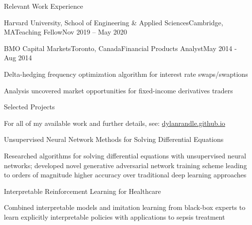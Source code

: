 \documentclass{resume} %
\begin{document}
\begin{rSection}{Relevant Work Experience}
\begin{rSubsection}{Harvard University, School of Engineering \& Applied Sciences}{Cambridge, MA}{Teaching Fellow}{Nov 2019 -- May 2020}
\end{rSubsection}


\begin{rSubsection}{BMO Capital Markets}{Toronto, Canada}{Financial Products Analyst}{May 2014 - Aug 2014}

\item Delta-hedging frequency optimization algorithm for interest rate swaps/swaptions
\item Analysis uncovered market opportunities for fixed-income derivatives traders
    
\end{rSubsection}


\end{rSection}


\newpage

\begin{rSection}{Selected Projects}

For all of my available work and further details, see: \url{dylanrandle.github.io}

\begin{rSubsection}{Unsupervised Neural Network Methods for Solving Differential Equations}{}{}{}

\item Researched algorithms for solving differential equations with unsupervised neural networks; developed novel generative adversarial network training scheme leading to orders of magnitude higher accuracy over traditional deep learning approaches
  
\end{rSubsection}

\begin{rSubsection}{Interpretable Reinforcement Learning for Healthcare}{}{}{}

\item Combined interpretable models and imitation learning from black-box experts to learn explicitly interpretable policies with applications to sepsis treatment
	
\end{rSubsection}

\end{rSection}
\end{document}
